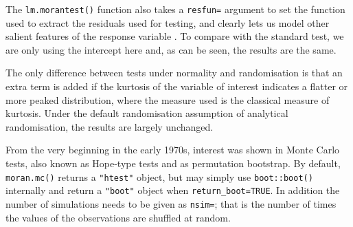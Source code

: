 \documentclass[]{book}
\newenvironment{Shaded}{\begin{snugshade}}{\end{snugshade}}
\newcommand{\CommentTok}[1]{\textcolor[rgb]{0.56,0.35,0.01}{\textit{#1}}}
\newcommand{\DataTypeTok}[1]{\textcolor[rgb]{0.13,0.29,0.53}{#1}}
\newcommand{\DecValTok}[1]{\textcolor[rgb]{0.00,0.00,0.81}{#1}}
\newcommand{\KeywordTok}[1]{\textcolor[rgb]{0.13,0.29,0.53}{\textbf{#1}}}
\newcommand{\NormalTok}[1]{#1}
\newcommand{\OperatorTok}[1]{\textcolor[rgb]{0.81,0.36,0.00}{\textbf{#1}}}
\newcommand{\StringTok}[1]{\textcolor[rgb]{0.31,0.60,0.02}{#1}}
\begin{document}
The \texttt{lm.morantest()} function also takes a \texttt{resfun=} argument to set the function used to extract the residuals used for testing, and clearly lets us model other salient features of the response variable \citep[p.~203]{cliff+ord:81}. To compare with the standard test, we are only using the intercept here and, as can be seen, the results are the same.

\begin{Shaded}
\end{Shaded}

The only difference between tests under normality and randomisation is that an extra term is added if the kurtosis of the variable of interest indicates a flatter or more peaked distribution, where the measure used is the classical measure of kurtosis. Under the default randomisation assumption of analytical randomisation, the results are largely unchanged.

\begin{Shaded}
\end{Shaded}

From the very beginning in the early 1970s, interest was shown in Monte Carlo tests, also known as Hope-type tests and as permutation bootstrap. By default, \texttt{moran.mc()} returns a \texttt{"htest"} object, but may simply use \texttt{boot::boot()} internally and return a \texttt{"boot"} object when \texttt{return\_boot=TRUE}. In addition the number of simulations needs to be given as \texttt{nsim=}; that is the number of times the values of the observations are shuffled at random.
\end{document}
